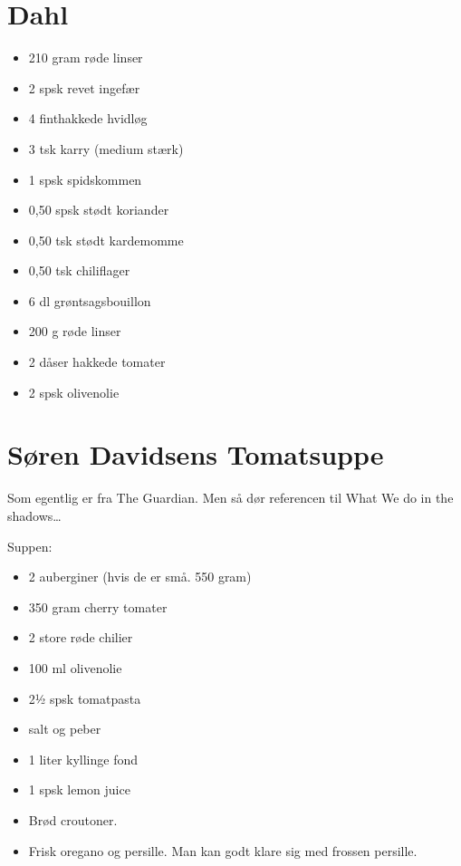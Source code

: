 \documentclass[
  letterpaper,
  DIV=11,
  numbers=noendperiod]{scrreprt}
\providecommand{\tightlist}{%
  \setlength{\itemsep}{0pt}\setlength{\parskip}{0pt}}\usepackage{longtable,booktabs,array}
\begin{document}
\hypertarget{dahl}{%
\section{Dahl}\label{dahl}}

\begin{itemize}
\tightlist
\item
  210 gram røde linser
\item
  2 spsk revet ingefær
\item
  4 finthakkede hvidløg
\item
  3 tsk karry (medium stærk)
\item
  1 spsk spidskommen
\item
  0,50 spsk stødt koriander
\item
  0,50 tsk stødt kardemomme
\item
  0,50 tsk chiliflager
\item
  6 dl grøntsagsbouillon
\item
  200 g røde linser
\item
  2 dåser hakkede tomater
\item
  2 spsk olivenolie
\end{itemize}

\hypertarget{suxf8ren-davidsens-tomatsuppe}{%
\section{Søren Davidsens
Tomatsuppe}\label{suxf8ren-davidsens-tomatsuppe}}

Som egentlig er fra The Guardian. Men så dør referencen til What We do
in the shadows\ldots{}

Suppen:

\begin{itemize}
\tightlist
\item
  2 auberginer (hvis de er små. 550 gram)
\item
  350 gram cherry tomater
\item
  2 store røde chilier
\item
  100 ml olivenolie
\item
  2½ spsk tomatpasta
\item
  salt og peber
\item
  1 liter kyllinge fond
\item
  1 spsk lemon juice
\item
  Brød croutoner.
\item
  Frisk oregano og persille. Man kan godt klare sig med frossen
  persille.
\end{itemize}
\end{document}

